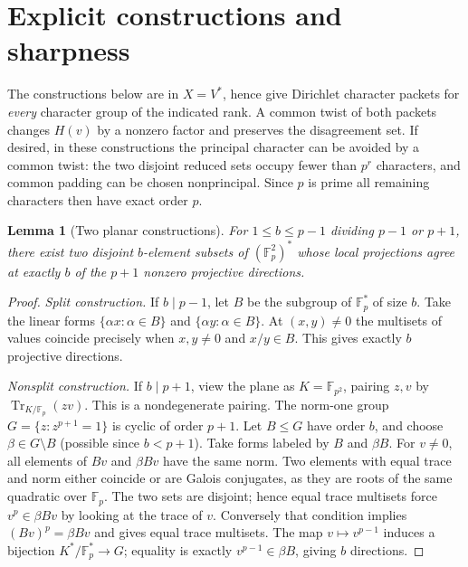 \documentclass[11pt]{article}
\newtheorem{lemma}[theorem]{Lemma}
\theoremstyle{remark}\newtheorem{remark}[theorem]{Remark}
\newcommand{\F}{\mathbb F}
\newcommand{\Tr}{\operatorname{Tr}}
\begin{document}
\section{Explicit constructions and sharpness}
The constructions below are in $X=V^*$, hence give Dirichlet character packets for \emph{every} character group of the indicated rank. A common twist of both packets changes $H(v)$ by a nonzero factor and preserves the disagreement set. If desired, in these constructions the principal character can be avoided by a common twist: the two disjoint reduced sets occupy fewer than $p^r$ characters, and common padding can be chosen nonprincipal. Since $p$ is prime all remaining characters then have exact order $p$.

\begin{lemma}[Two planar constructions]\label{lem:construct}
For $1\le b\le p-1$ dividing $p-1$ or $p+1$, there exist two disjoint $b$-element subsets of $(\F_p^2)^*$ whose local projections agree at exactly $b$ of the $p+1$ nonzero projective directions.
\end{lemma}
\begin{proof}
\emph{Split construction.} If $b\mid p-1$, let $B$ be the subgroup of $\F_p^*$ of size $b$. Take the linear forms $\{\alpha x:\alpha\in B\}$ and $\{\alpha y:\alpha\in B\}$. At $(x,y)\ne0$ the multisets of values coincide precisely when $x,y\ne0$ and $x/y\in B$. This gives exactly $b$ projective directions.

\emph{Nonsplit construction.} If $b\mid p+1$, view the plane as $K=\F_{p^2}$, pairing $z,v$ by $\Tr_{K/\F_p}(zv)$. This is a nondegenerate pairing. The norm-one group $G=\{z:z^{p+1}=1\}$ is cyclic of order $p+1$. Let $B\le G$ have order $b$, and choose $\beta\in G\setminus B$ (possible since $b<p+1$). Take forms labeled by $B$ and $\beta B$. For $v\ne0$, all elements of $Bv$ and $\beta Bv$ have the same norm. Two elements with equal trace and norm either coincide or are Galois conjugates, as they are roots of the same quadratic over $\F_p$. The two sets are disjoint; hence equal trace multisets force $v^p\in\beta Bv$ by looking at the trace of $v$. Conversely that condition implies $(Bv)^p=\beta Bv$ and gives equal trace multisets. The map $v\mapsto v^{p-1}$ induces a bijection $K^*/\F_p^*\to G$; equality is exactly $v^{p-1}\in\beta B$, giving $b$ directions.
\end{proof}
\end{document}
